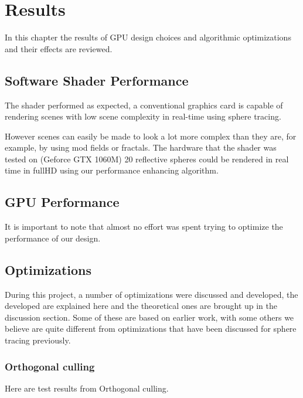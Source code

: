 \chapter{Results}

	In this chapter the results of GPU design choices and algorithmic optimizations
	and their effects are reviewed.

	\section{Software Shader Performance}

		The shader performed as expected, a conventional graphics card is 
		capable of rendering scenes with low scene complexity in real-time
		using sphere tracing.

		However scenes can easily be made to look a lot more complex than they 
		are, for example, by using mod fields or fractals. The hardware that 
		the shader was tested on (Geforce GTX 1060M) 20 reflective spheres could
		be rendered in real time in fullHD using our performance enhancing 
		algorithm.


	\section{GPU Performance}

		It is important to note that almost no effort was spent trying to
		optimize the performance of our design. 

	\section{Optimizations}
		
		During this project, a number of optimizations were discussed and
		developed, the developed are explained here and the theoretical ones
		are brought up in the discussion section. Some of these are based on
		earlier work, with some others we believe are quite different from
		optimizations that have been discussed for sphere tracing previously.

		\subsection{Orthogonal culling}

			Here are test results from Orthogonal culling.


